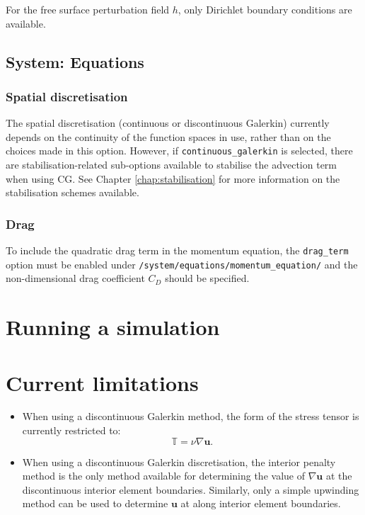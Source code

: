 \documentclass[a4paper,11pt]{report}
\begin{document}
For the free surface perturbation field $h$, only Dirichlet boundary conditions are available.

\subsection{System: Equations}

\subsubsection{Spatial discretisation}
The spatial discretisation (continuous or discontinuous Galerkin) currently depends on the continuity of the function spaces in use, rather than on the choices made in this option. However, if \texttt{continuous\_galerkin} is selected, there are stabilisation-related sub-options available to stabilise the advection term when using CG. See Chapter \ref{chap:stabilisation} for more information on the stabilisation schemes available.

\subsubsection{Drag}
To include the quadratic drag term in the momentum equation, the \texttt{drag\_term} option must be enabled under \texttt{/system/equations/momentum\_equation/} and the non-dimensional drag coefficient $C_D$ should be specified.

 
\section{Running a simulation}

\section{Current limitations}
\begin{itemize}
   \item When using a discontinuous Galerkin method, the form of the stress tensor is currently restricted to:
   \begin{equation}
      \mathbb{T} = \nu\nabla\mathbf{u}.
   \end{equation}
   \item When using a discontinuous Galerkin discretisation, the interior penalty method is the only method available for determining the value of $\nabla\mathbf{u}$ at the discontinuous interior element boundaries. Similarly, only a simple upwinding method can be used to determine $\mathbf{u}$ at along interior element boundaries.
\end{itemize}
\end{document}
